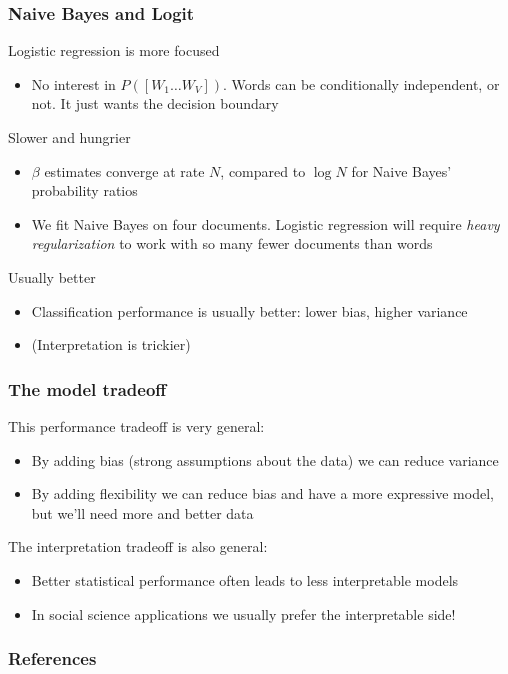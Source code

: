 \documentclass{hertieteaching}
\begin{document}
\begin{frame}[t,fragile]\frametitle{Naive Bayes and Logit}

Logistic regression is more focused
\begin{itemize}
  \item No interest in $P([W_1 \ldots W_V])$. Words can be conditionally independent, or not. It just wants the decision boundary
\end{itemize}
Slower and hungrier
\begin{itemize}
  \item $\beta$ estimates converge at rate $N$, compared to $\log N$ for Naive Bayes' probability ratios
  \item We fit Naive Bayes on four documents. Logistic regression will require \textit{heavy regularization} to work with so many fewer documents than words
\end{itemize}
Usually better
\begin{itemize}
  \item Classification performance is usually better: lower bias, higher variance
  \item (Interpretation is trickier)
\end{itemize}

\end{frame}

\begin{frame}[t,fragile]\frametitle{The model tradeoff}

This performance tradeoff is very general:
\begin{itemize}
  \item By adding bias (strong assumptions about the data) we can reduce variance
  \item By adding flexibility we can reduce bias and have a more expressive model, but we'll need more and better data
\end{itemize}

The interpretation tradeoff is also general:
\begin{itemize}
  \item Better statistical performance often leads to less interpretable models \parencite{Chang.etal2009}
  \item In social science applications we usually prefer the interpretable side!
\end{itemize}





\end{frame}

\begin{frame}[allowframebreaks]
\frametitle{References}
\printbibliography	
\end{frame}
\end{document}
